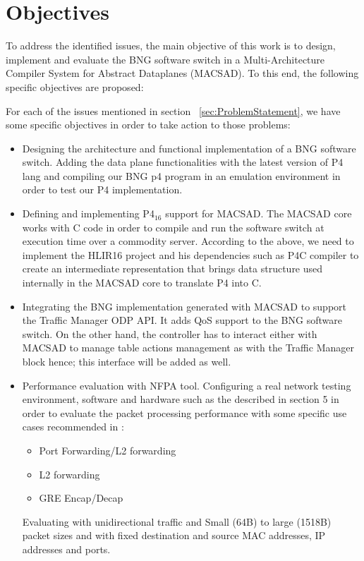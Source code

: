 \section{Objectives}
\label{sec:sec02}
To address the identified issues, the main objective of this work is to design, implement and evaluate the \acrshort{BNG} software switch in a Multi-Architecture Compiler System for Abstract Dataplanes (MACSAD). To this end, the following specific objectives are proposed: 

For each of the issues mentioned in section ~\ref{sec:ProblemStatement}, we have some specific objectives in order to take action to those problems:

\begin{itemize}

\item Designing the architecture and functional implementation of a BNG software switch.  Adding the data plane functionalities with the latest version of P4 lang and compiling our BNG p4 program in an emulation environment in order to test our P4 implementation.

\item Defining and implementing P4$_{16}$ support for MACSAD.  The MACSAD core works with C code in order to compile and run the software switch at execution time over a commodity server. According to the above, we need to implement the HLIR16 project and his dependencies such as P4C compiler to create an intermediate representation that brings data structure used internally in the MACSAD core to translate P4 into C.

\item Integrating the BNG implementation generated with MACSAD to support the Traffic Manager ODP API.  It adds QoS support to the BNG software switch.  On the other hand,  the controller has to interact either with MACSAD to manage table actions management as with the Traffic Manager block hence; this interface will be added as well. 

\item Performance evaluation with NFPA tool. Configuring a real network testing environment, software and hardware such as the described in section 5 in order to evaluate the packet processing performance with some specific use cases recommended in \cite{Nemeth}:
\begin{itemize}
 \item Port Forwarding/L2 forwarding
 \item L2 forwarding
 \item GRE Encap/Decap
\end{itemize}
Evaluating with unidirectional traffic and Small (64B) to large (1518B) packet sizes and with fixed destination and source MAC addresses, IP addresses and ports.


\end{itemize}




